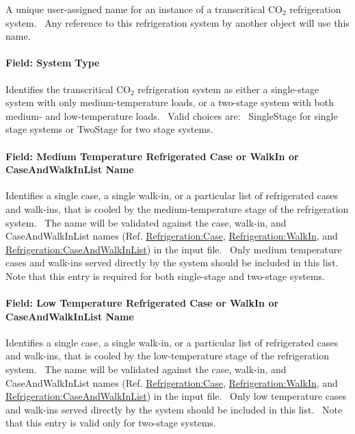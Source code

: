A unique user-assigned name for an instance of a transcritical CO\(_{2}\) refrigeration system.~ Any reference to this refrigeration system by another object will use this name.

\paragraph{Field: System Type}\label{field-system-type}

Identifies the transcritical CO\(_{2}\) refrigeration system as either a single-stage system with only medium-temperature loads, or a two-stage system with both medium- and low-temperature loads.~ Valid choices are:~ SingleStage for single stage systems or TwoStage for two stage systems.

\paragraph{Field: Medium Temperature Refrigerated Case or WalkIn or CaseAndWalkInList Name}\label{field-medium-temperature-refrigerated-case-or-walkin-or-caseandwalkinlist-name}

Identifies a single case, a single walk-in, or a particular list of refrigerated cases and walk-ins, that is cooled by the medium-temperature stage of the refrigeration system.~ The name will be validated against the case, walk-in, and CaseAndWalkInList names (Ref. \hyperref[refrigerationcase]{Refrigeration:Case}, \hyperref[refrigerationwalkin]{Refrigeration:WalkIn}, and \hyperref[refrigerationcaseandwalkinlist]{Refrigeration:CaseAndWalkInList}) in the input file.~ Only medium temperature cases and walk-ins served directly by the system should be included in this list.~ Note that this entry is required for both single-stage and two-stage systems.

\paragraph{Field: Low Temperature Refrigerated Case or WalkIn or CaseAndWalkInList Name}\label{field-low-temperature-refrigerated-case-or-walkin-or-caseandwalkinlist-name}

Identifies a single case, a single walk-in, or a particular list of refrigerated cases and walk-ins, that is cooled by the low-temperature stage of the refrigeration system.~ The name will be validated against the case, walk-in, and CaseAndWalkInList names (Ref. \hyperref[refrigerationcase]{Refrigeration:Case}, \hyperref[refrigerationwalkin]{Refrigeration:WalkIn}, and \hyperref[refrigerationcaseandwalkinlist]{Refrigeration:CaseAndWalkInList}) in the input file.~ Only low temperature cases and walk-ins served directly by the system should be included in this list.~ Note that this entry is valid only for two-stage systems.

